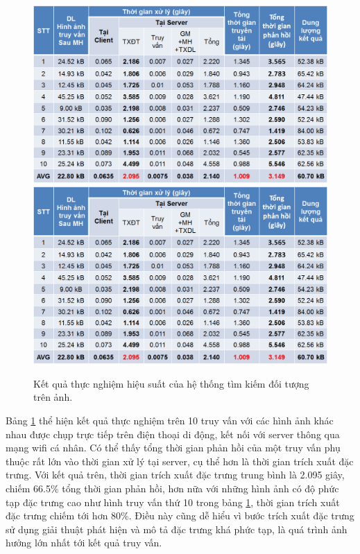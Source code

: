 \begin{figure}[!htbp]
  \begin{center}
    \leavevmode
    \ifpdf
      \includegraphics[scale=0.3]{app_experimental}
    \else
      \includegraphics[scale=0.3]{app_experimental}
    \fi
    \caption[Kết quả thực nghiệm hiệu suất của hệ thống tìm kiếm đối tượng trên ảnh.]{Kết quả thực nghiệm hiệu suất của hệ thống tìm kiếm đối tượng trên ảnh.}
    \label{FigAppExperimental}
  \end{center}
\end{figure}
		
	Bảng \ref{FigAppExperimental} thể hiện kết quả thực nghiệm trên 10 truy vấn với các hình ảnh khác nhau được chụp trực tiếp trên điện thoại di động, kết nối với server thông qua mạng wifi cá nhân. Có thể thấy tổng thời gian phản hồi của một truy vấn phụ thuộc rất lớn vào thời gian xử lý tại server, cụ thể hơn là thời gian trích xuất đặc trưng. Với kết quả trên, thời gian trích xuất đặc trưng trung bình là 2.095 giây, chiếm 66.5\% tổng thời gian phản hồi, hơn nữa với những hình ảnh có độ phức tạp đặc trưng cao như hình truy vấn thứ 10 trong bảng \ref{FigAppExperimental}, thời gian trích xuất đặc trưng chiếm tới hơn 80\%. Điều này cũng dễ hiểu vì bước trích xuất đặc trưng sử dụng giải thuật phát hiện và mô tả đặc trưng khá phức tạp, là quá trình ảnh hưởng lớn nhất tới kết quả truy vấn.
	
